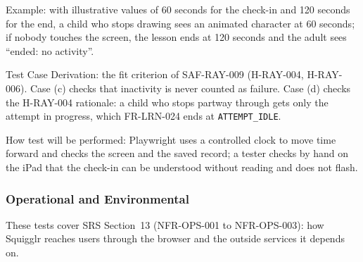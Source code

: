 \documentclass[12pt, titlepage]{article}
\begin{document}
\begin{enumerate}
Example: with illustrative values of 60 seconds for the check-in and 120
seconds for the end, a child who stops drawing sees an animated character at 60 seconds; if nobody
touches the screen, the lesson ends at 120 seconds and the adult sees ``ended:
no activity''.

Test Case Derivation: the fit criterion of SAF-RAY-009 (H-RAY-004,
H-RAY-006). Case (c) checks that inactivity is never counted as failure.
Case (d) checks the H-RAY-004 rationale: a child who stops partway through
gets only the attempt in progress, which FR-LRN-024 ends at
\texttt{ATTEMPT\_IDLE}.

How test will be performed: Playwright uses a controlled clock to move time
forward and checks the screen and the saved record; a tester checks by hand
on the iPad that the check-in can be understood without reading and does
not flash.

\end{enumerate}

\subsubsection{Operational and Environmental}
\label{sec:ops-tests}

These tests cover SRS Section~13 (NFR-OPS-001 to NFR-OPS-003): how
Squigglr reaches users through the browser and the outside services it
depends on.
\end{document}
